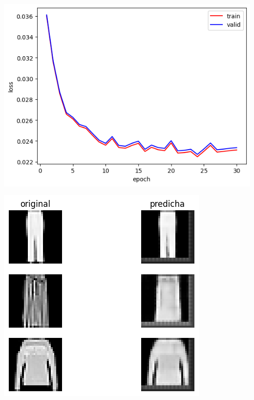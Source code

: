 \documentclass[aps,prl,reprint,groupedaddress]{revtex4-2}
\newenvironment{Figura}
  {\par\medskip\noindent\minipage{\linewidth}}
  {\endminipage\par\medskip}
\begin{document}
\begin{Figura}
  \centering
  \begin{minipage}[t]{0.58\linewidth}
    \centering
    \includegraphics[width=\textwidth]{figs1/modelo_n256_dropout01.png}
    \label{fig-model-dropout01-256}
  \end{minipage}%
  \hfill
  \begin{minipage}[t]{0.41\linewidth}
    \centering
    \includegraphics[width=\textwidth]{figs1/test_modelo_n256_dropout01.png}
    \label{fig-model-dropout01b-256}
  \end{minipage}
\end{Figura}
\end{document}
